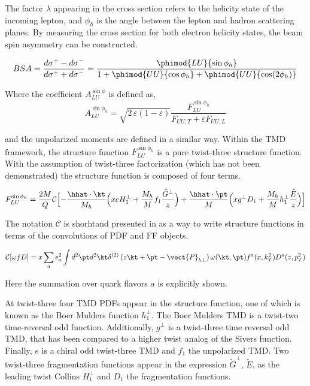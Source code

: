 The factor $\lambda$ appearing in the cross section refers to the helicity state of the incoming lepton, and $\phi_h$ is the angle between the lepton and hadron scattering planes.  By measuring the cross section for both electron helicity states, the beam spin asymmetry can be constructed.  

\begin{equation}
  BSA = \frac{d\sigma^+ - d\sigma^-}{d\sigma^+ + d\sigma^-} = \frac{\phimod{LU}{\sin\phi_h}}{1 + \phimod{UU}{\cos\phi_h} + \phimod{UU}{\cos(2\phi_h)}}
\end{equation}

Where the coefficient $A_{LU}^{\sin\phi}$ is defined as, 
\begin{equation}
  A_{LU}^{\sin\phi_h} = \sqrt{2\,\varepsilon (1-\varepsilon)} \frac{F_{LU}^{\sin\phi_h}}{F_{UU,T} + \varepsilon F_{UU,L}}
\end{equation}

and the unpolarized moments are defined in a similar way.  Within the TMD framework, the structure function $F_{LU}^{\sin\phi_h}$ is a pure twist-three structure function.  With the assumption of twist-three factorization (which has not been demonstrated) the structure function is composed of four terms.

\begin{equation}
  F_{LU}^{\sin\phi_h} = \frac{2M}{Q} \mathcal{C} \Bigl[ -\frac{\hhat \cdot \kt}{M_h} \Bigl( xeH_1^\perp + \frac{M_h}{M} f_1 \frac{\tilde{G}^\perp}{z} \Bigr) + \frac{\hhat \cdot \pt}{M} \Bigl( xg^\perp D_1 + \frac{M_h}{M} h_{1}^{\perp} \frac{\tilde{E}}{z} \Bigr) \Bigr]
\end{equation}

The notation $\mathcal{C}$ is shorhtand  presented in \cite{tmds-bacchetta:2006} as a way to write structure functions in terms of the convolutions of PDF and FF objects.

\begin{equation}
  \mathcal{C}[\omega f D] = x \sum_{a} e^{2}_{a} \int d^{2}\pt d^{2}\kt \delta^{(2)} \left( z\kt + \pt - \vect{P}_{h\perp} \right) \omega (\kt, \pt) f^{a}(x, k_{T}^{2}) D^{a}(z, p_{T}^{2}) 
\end{equation}

Here the summation over quark flavors $a$ is explicitly shown.

At twist-three four TMD PDFs appear in the structure function, one of which is known as the Boer Mulders function $h_{1}^{\perp}$.  The Boer Mulders TMD is a twist-two time-reversal odd function.  Additionally, $g^{\perp}$ is a twist-three time reversal odd TMD, that has been compared to a higher twist analog of the Sivers function.  Finally, $e$ is a chiral odd twist-three TMD and $f_1$ the unpolarized TMD.  Two twist-three fragmentation functions appear in the expression $\tilde{G}^{\perp}$, $\tilde{E}$, as the leading twist Collins $H_{1}^{\perp}$ and $D_1$ the fragmentation functions.

